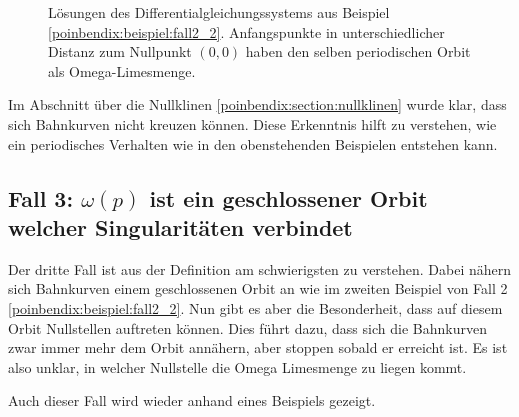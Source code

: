 \begin{figure}
\centering
    
    \caption{Lösungen des Differentialgleichungssystems aus Beispiel \ref{poinbendix:beispiel:fall2_2}.
    Anfangspunkte in unterschiedlicher Distanz zum Nullpunkt $(0,0)$ haben den selben periodischen Orbit als Omega-Limesmenge.}
\label{poinbendix:fig:fall_2_2}
\end{figure}

Im Abschnitt über die Nullklinen \ref{poinbendix:section:nullklinen} wurde klar, dass sich Bahnkurven nicht kreuzen können.
Diese Erkenntnis hilft zu verstehen, wie ein periodisches Verhalten wie in den obenstehenden Beispielen entstehen kann.

\subsection{Fall 3: $\omega(p)$ ist ein geschlossener Orbit welcher Singularitäten verbindet} \label{poinbendix:subsection:fall3}

Der dritte Fall ist aus der Definition am schwierigsten zu verstehen.
Dabei nähern sich Bahnkurven einem geschlossenen Orbit an wie im zweiten Beispiel von Fall 2 \ref{poinbendix:beispiel:fall2_2}.
Nun gibt es aber die Besonderheit, dass auf diesem Orbit Nullstellen auftreten können.
Dies führt dazu, dass sich die Bahnkurven zwar immer mehr dem Orbit annähern, aber stoppen sobald er erreicht ist.
Es ist also unklar, in welcher Nullstelle die Omega Limesmenge zu liegen kommt.

Auch dieser Fall wird wieder anhand eines Beispiels gezeigt.

